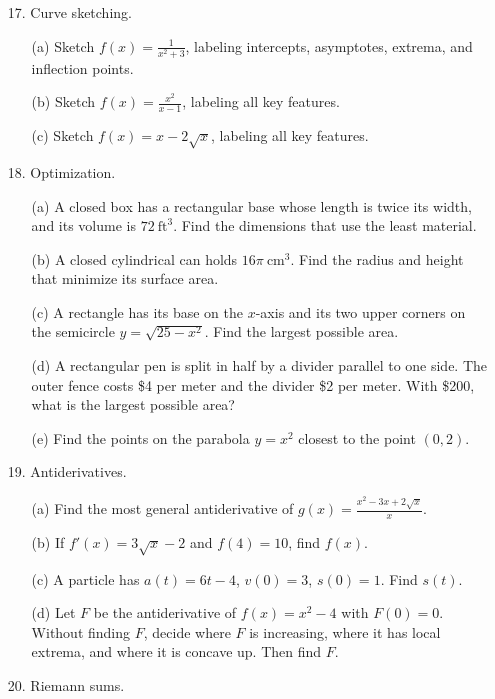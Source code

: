 \documentclass[12pt]{article}
\begin{document}
\begin{enumerate}
\begin{enumerate}
\end{enumerate}
\item[17.] Curve sketching.
\begin{enumerate}
\item[(a)] Sketch $f(x) = \frac{1}{x^2+3}$, labeling intercepts, asymptotes, extrema, and inflection points.
\item[(b)] Sketch $f(x) = \frac{x^2}{x-1}$, labeling all key features.
\item[(c)] Sketch $f(x) = x - 2\sqrt{x}$, labeling all key features.
\end{enumerate}
\item[18.] Optimization.
\begin{enumerate}
\item[(a)] A closed box has a rectangular base whose length is twice its width, and its volume is $72\ \text{ft}^3$. Find the dimensions that use the least material.
\item[(b)] A closed cylindrical can holds $16\pi\ \text{cm}^3$. Find the radius and height that minimize its surface area.
\item[(c)] A rectangle has its base on the $x$-axis and its two upper corners on the semicircle $y = \sqrt{25 - x^2}$. Find the largest possible area.
\item[(d)] A rectangular pen is split in half by a divider parallel to one side. The outer fence costs \$4 per meter and the divider \$2 per meter. With \$200, what is the largest possible area?
\item[(e)] Find the points on the parabola $y = x^2$ closest to the point $(0,2)$.
\end{enumerate}
\item[19.] Antiderivatives.
\begin{enumerate}
\item[(a)] Find the most general antiderivative of $g(x) = \frac{x^2 - 3x + 2\sqrt{x}}{x}$.
\item[(b)] If $f'(x) = 3\sqrt{x} - 2$ and $f(4) = 10$, find $f(x)$.
\item[(c)] A particle has $a(t) = 6t - 4$, $v(0) = 3$, $s(0) = 1$. Find $s(t)$.
\item[(d)] Let $F$ be the antiderivative of $f(x) = x^2 - 4$ with $F(0) = 0$. Without finding $F$, decide where $F$ is increasing, where it has local extrema, and where it is concave up. Then find $F$.
\end{enumerate}
\item[20.] Riemann sums.
\begin{enumerate}

\end{enumerate}
\end{enumerate}
\end{document}
